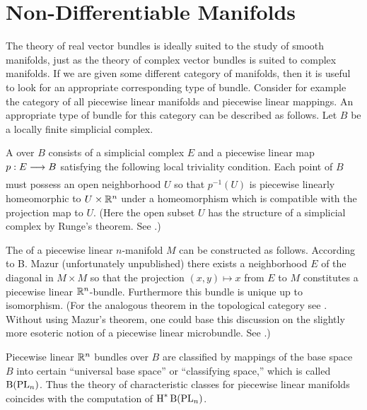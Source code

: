 \documentclass[../main]{subfiles}
\begin{document}
\section{Non-Differentiable Manifolds}
The theory of real vector bundles is ideally suited to the study of smooth manifolds, just as the theory of complex vector bundles is suited to complex manifolds. If we are given some different category of manifolds, then it is useful to look for an appropriate corresponding type of bundle. Consider for example the category of all piecewise linear manifolds and piecewise linear mappings. An appropriate type of bundle for this category can be described as follows. Let $B$ be a locally finite simplicial complex.

\begin{definition}
A  over $B$ consists of a simplicial complex $E$ and a piecewise linear map $p:E \varrightarrow{} B$ satisfying the following local triviality condition. Each point of $B$ must possess an open neighborhood $U$ so that $p^{-1}(U)$ is piecewise linearly homeomorphic to $U \times \mathbb R^n$ under a homeomorphism which is compatible with the projection map to $U$. (Here the open subset $U$ has the structure of a simplicial complex by Runge's theorem. See \cite{alexandroff}.)
\end{definition}

The  of a piecewise linear $n$-manifold $M$ can be constructed as follows. According to B. Mazur (unfortunately unpublished) there exists a neighborhood $E$ of the diagonal in $M \times M$ so that the projection $(x,y) \mapsto x$ from $E$ to $M$ constitutes a piecewise linear $\mathbb R^n$-bundle. Furthermore this bundle is unique up to isomorphism. (For the analogous theorem in the topological category see \cite{kirster}. Without using Mazur's theorem, one could base this discussion on the slightly more esoteric notion of a piecewise linear microbundle. See \cite{milnor1965}.)

Piecewise linear $\mathbb R^n$ bundles over $B$ are classified by mappings of the base space $B$ into certain ``universal base space'' or ``classifying space,'' which is called $\operatorname{B}(\operatorname{PL}_n)$. Thus the theory of characteristic classes for piecewise linear manifolds coincides with the computation of $\operatorname{H}^\ast \operatorname{B}(\operatorname{PL}_n)$.
\end{document}
